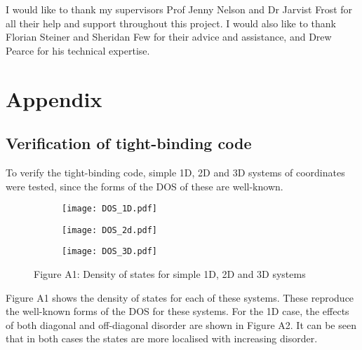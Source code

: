 \documentclass[a4paper,12pt]{article}
\begin{document}
\noindent I would like to thank my supervisors Prof Jenny Nelson and Dr Jarvist Frost for all their help and support throughout this project. I would also like to thank Florian Steiner and Sheridan Few for their advice and assistance, and Drew Pearce for his technical expertise.  




\appendix
\section{Appendix}

\subsection{Verification of tight-binding code}

\noindent To verify the tight-binding code, simple 1D, 2D and 3D systems of coordinates were tested, since the forms of the DOS of these are well-known. 


\begin{figure}[H]
\centering
\begin{subfigure}[b]{0.3\textwidth}
\texttt{[image: DOS\_1D.pdf]}
\end{subfigure}
\begin{subfigure}[b]{0.3\textwidth}
\texttt{[image: DOS\_2d.pdf]}
\end{subfigure}
\begin{subfigure}[b]{0.3\textwidth}
\texttt{[image: DOS\_3D.pdf]}
\end{subfigure}
\caption*{Figure A1: Density of states for simple 1D, 2D and 3D systems}
\label{fig:ver}
\end{figure}

\noindent Figure A1 shows the density of states for each of these systems. These reproduce the well-known forms of the DOS for these systems. For the 1D case, the effects of both diagonal and off-diagonal disorder are shown in Figure A2. It can be seen that in both cases the states are more localised with increasing disorder.
\end{document}
